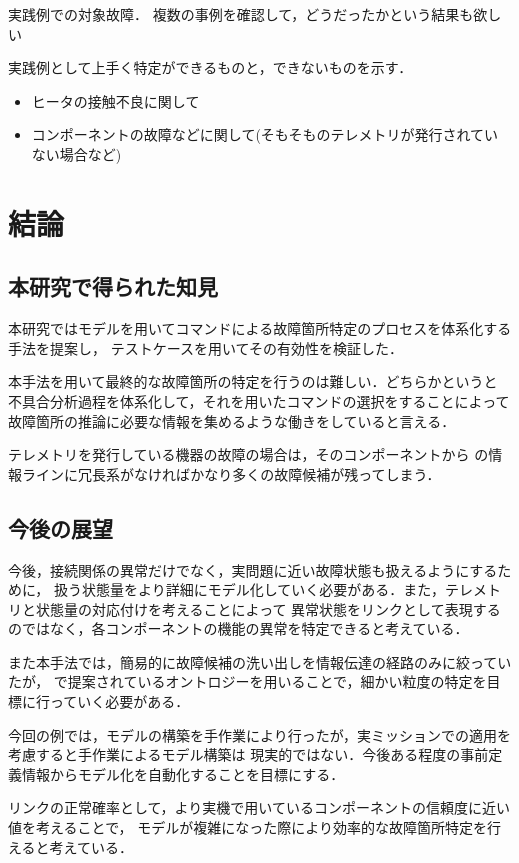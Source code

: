 \documentclass[11pt]{jsarticle}%
\begin{document}
\begin{multicols}{2}
  実践例での対象故障．
  複数の事例を確認して，どうだったかという結果も欲しい


  実践例として上手く特定ができるものと，できないものを示す．
 \begin{itemize}
   \item ヒータの接触不良に関して
   \item コンポーネントの故障などに関して(そもそものテレメトリが発行されていない場合など)
 \end{itemize}
  \subsection{}

  \section{結論}
  \subsection{本研究で得られた知見}%
本研究ではモデルを用いてコマンドによる故障箇所特定のプロセスを体系化する手法を提案し，
テストケースを用いてその有効性を検証した．

  本手法を用いて最終的な故障箇所の特定を行うのは難しい．どちらかというと
  不具合分析過程を体系化して，それを用いたコマンドの選択をすることによって
  故障箇所の推論に必要な情報を集めるような働きをしていると言える．

  テレメトリを発行している機器の故障の場合は，そのコンポーネントから
  の情報ラインに冗長系がなければかなり多くの故障候補が残ってしまう．

  \subsection{今後の展望}
 今後，接続関係の異常だけでなく，実問題に近い故障状態も扱えるようにするために，
 扱う状態量をより詳細にモデル化していく必要がある．また，テレメトリと状態量の対応付けを考えることによって
 異常状態をリンクとして表現するのではなく，各コンポーネントの機能の異常を特定できると考えている．

 また本手法では，簡易的に故障候補の洗い出しを情報伝達の経路のみに絞っていたが，
 \cite{}で提案されているオントロジーを用いることで，細かい粒度の特定を目標に行っていく必要がある．

 今回の例では，モデルの構築を手作業により行ったが，実ミッションでの適用を考慮すると手作業によるモデル構築は
 現実的ではない．今後ある程度の事前定義情報からモデル化を自動化することを目標にする．
  
 リンクの正常確率として，より実機で用いているコンポーネントの信頼度に近い値を考えることで，
 モデルが複雑になった際により効率的な故障箇所特定を行えると考えている．

  
   

\end{multicols}
\end{document}
